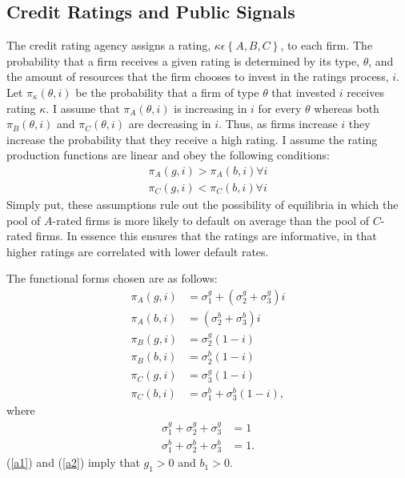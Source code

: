 \documentclass[notitlepage]{article}
\begin{document}
\subsection{Credit Ratings and Public Signals}
The credit rating agency assigns a rating, $\kappa\epsilon\left\{A,B,C\right\}$, to each firm. The probability that a firm receives a given rating is determined by its type, $\theta$, and the amount of resources that the firm chooses to invest in the ratings process, $i$. Let $\pi_{\kappa}(\theta,i)$ be the probability that a firm of type $\theta$ that invested $i$ receives rating $\kappa$. I assume that $\pi_{A}(\theta,i)$ is increasing in $i$ for every $\theta$ whereas both $\pi_{B}(\theta,i)$ and $\pi_{C}(\theta,i)$ are decreasing in $i$. Thus, as firms increase $i$ they increase the probability that they receive a high rating. I assume the rating production functions are linear and obey the following conditions:
\begin{align} 
\label{a1}\pi_{A}(g,i)>\pi_{A}(b,i) \forall i \\
\label{a2}\pi_{C}(g,i)<\pi_{C}(b,i) \forall i 
\end{align}
Simply put, these assumptions rule out the possibility of equilibria in which the pool of $A$-rated firms is more likely to default on average than the pool of $C$-rated firms. In essence this ensures that the ratings are informative, in that higher ratings are correlated with lower default rates.

The functional forms chosen are as follows:
\begin{align*}
	\pi_{A}(g,i) & = \sigma^{g}_{1} + (\sigma^{g}_{2}+\sigma^{g}_{3})i\\
	\pi_{A}(b,i) & =         (\sigma^{b}_{2}+\sigma^{b}_{3})i\\
	\pi_{B}(g,i) & =          \sigma^{g}_{2}(1-i )\\
	\pi_{B}(b,i) & =          \sigma^{b}_{2}(1-i )\\
	\pi_{C}(g,i) & =          \sigma^{g}_{3}(1-i )\\
	\pi_{C}(b,i) & = \sigma^{b}_{1} +  \sigma^{b}_{3}(1-i ),
\end{align*}
where
\begin{align*}
\sigma^{g}_{1}+\sigma^{g}_{2}+\sigma^{g}_{3} & =1\\
\sigma^{b}_{1}+\sigma^{b}_{2}+\sigma^{b}_{3} & =1.
\end{align*}
(\ref{a1}) and (\ref{a2}) imply that $g_{1}>0$ and $b_{1}>0$.
\end{document}
